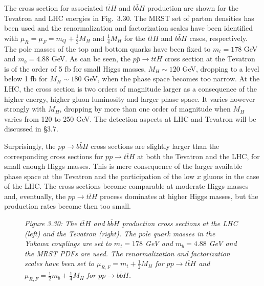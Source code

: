 The cross section for associated $t\bar tH$ and $b\bar bH$ production are 
shown for the Tevatron and LHC energies in Fig.~3.30. 
The MRST set of parton densities has been used and the renormalization and
factorization scales have been identified with $\mu_R=\mu_F=m_Q+\frac{1}{2}M_H$
and $\frac{1}{4}M_H$ for the $t\bar t H$ and $b \bar b H$ cases, respectively.
The pole masses of the top and bottom quarks have been fixed to $m_t=178$ 
GeV and $m_b=4.88$ GeV. As can be seen,  the $p \bar p \to t \bar t H$ cross 
section at the Tevatron is of the order of 5 fb for small Higgs masses,
$M_H \sim 120$ GeV, dropping to a level below 1 fb for $M_H \sim 180$ GeV, 
when the phase space becomes too narrow. At the LHC, the cross section is two 
orders of magnitude larger as a consequence of the higher energy, higher gluon 
luminosity and larger phase space. It varies however strongly with $M_H$,   
dropping by more than one order of magnitude when $M_H$ varies from 120 to 250 
GeV. The detection aspects at LHC \cite{pp-gHtt-pheno,pp-Htt-gamma,pp-Htt-gamma1,pp-Htt-bb,pp-Htt-VV,pp-Htt-WW,pp-Htt-tau} and Tevatron \cite{pp-Htt-phenoT} 
will be discussed in \S3.7. \s

Surprisingly, the $p p \to b \bar b H$ cross sections are slightly
larger than the corresponding cross sections for $p p \to t \bar t H$
at both the Tevatron and the LHC, for small enough Higgs masses. 
This is mere consequence of the larger available phase space at the Tevatron 
and the participation of the low $x$ gluons in the case of the LHC. The cross 
sections become comparable at moderate Higgs masses and, eventually, the $p 
p \to t \bar t H$ process dominates at higher Higgs masses, but the
production rates become then  too small.  

\begin{figure}[!h]
\begin{center}
\vspace*{-2.8cm}
\hspace*{-2.5cm}
\end{center}
\vspace*{-14.7cm}
{\it Figure 3.30: The $t\bar t H$ and $b\bar b H$ production cross sections 
at the LHC (left) and the Tevatron (right). The pole quark masses in the Yukawa
couplings are set to $m_t=178$ GeV and $m_b=4.88$ GeV and the MRST PDFs are 
used. The renormalization and factorization scales have been set to $\mu_{R,F}=
 m_t+\frac{1}{2} M_H$ for $pp \to t\bar tH$ and $\mu_{R,F}=  \frac{1}{2} m_b+  
\frac{1}{4}M_H$ for $pp \to b\bar b H$.} 
\vspace*{-9mm} 
\end{figure}


